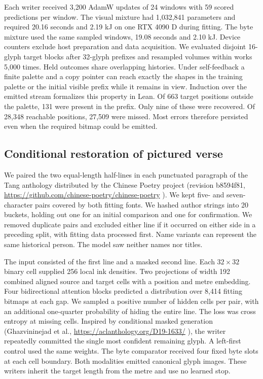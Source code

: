 \documentclass[12pt,a4paper]{article}
\providecommand{\DIFadd}[1]{{\protect\color{blue} \sf #1}} %
\begin{document}
\DIFadd{Each writer received 3,200 AdamW updates of 24 windows with 59 scored predictions per window. The visual mixture had 1,032,841 parameters and required 20.16 seconds and 2.19 kJ on one RTX 4090 D during fitting. The byte mixture used the same sampled windows, 19.08 seconds and 2.10 kJ. Device counters exclude host preparation and data acquisition. We evaluated disjoint 16-glyph target blocks after 32-glyph prefixes and resampled volumes within works 5,000 times. Held outcomes share overlapping histories. Under self-feedback a finite palette and a copy pointer can reach exactly the shapes in the training palette or the initial visible prefix while it remains in view. Induction over the emitted stream formalizes this property in Lean. Of 663 target positions outside the palette, 131 were present in the prefix. Only nine of these were recovered. Of 28,348 reachable positions, 27,509 were missed. Most errors therefore persisted even when the required bitmap could be emitted.
}

\subsection*{\DIFadd{Conditional restoration of pictured verse}}
\DIFadd{We paired the two equal-length half-lines in each punctuated paragraph of the Tang anthology distributed by the Chinese Poetry project (revision b8594f81, }\url{https://github.com/chinese-poetry/chinese-poetry}\DIFadd{). We kept five- and seven-character pairs covered by both fitting fonts. We hashed author strings into 20 buckets, holding out one for an initial comparison and one for confirmation. We removed duplicate pairs and excluded either line if it occurred on either side in a preceding split, with fitting data processed first. Name variants can represent the same historical person. The model saw neither names nor titles.
}

\DIFadd{The input consisted of the first line and a masked second line. Each $32\times32$ binary cell supplied 256 local ink densities. Two projections of width 192 combined aligned source and target cells with a position and metre embedding. Four bidirectional attention blocks predicted a distribution over 8,414 fitting bitmaps at each gap. We sampled a positive number of hidden cells per pair, with an additional one-quarter probability of hiding the entire line. The loss was cross entropy at missing cells. Inspired by conditional masked generation (Ghazvininejad et al., }\url{https://aclanthology.org/D19-1633/}\DIFadd{), the writer repeatedly committed the single most confident remaining glyph. A left-first control used the same weights. The byte comparator received four fixed byte slots at each cell boundary. Both modalities emitted canonical glyph images. These writers inherit the target length from the metre and use no learned stop.
}
\end{document}
